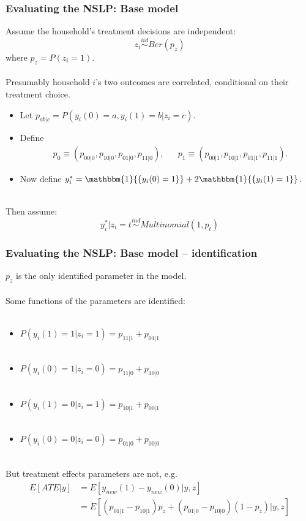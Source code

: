 \documentclass[xcolor=dvipsnames]{beamer}
\newcommand{\indicator}[1]{\mathbbm{1}{\left\{ {#1} \right\} }}
\begin{document}
\begin{frame}
  \frametitle{Evaluating the NSLP: Base model}
Assume the household's treatment decisions are independent:
    \[
    z_i \stackrel{iid}{\sim}Ber(p_z)
    \]
    where $p_z=P(z_i=1)$.\\~\\
\pause Presumably household $i$'s two outcomes are correlated, conditional on their treatment choice. 
    \begin{itemize}
      \item Let $  p_{ab|c} = P(y_i(0)=a, y_i(1)=b|z_i=c)$.
      \item Define 
        \begin{align*}
          &p_0\equiv (p_{00|0}, p_{10|0}, p_{01|0}, p_{11|0}), &&p_1\equiv (p_{00|1}, p_{10|1}, p_{01|1}, p_{11|1}).
        \end{align*}
      \item Now define $y_i^*=\indicator{y_i(0)=1} + 2\indicator{y_i(1)=1}$. \\~
      \end{itemize}
\pause Then assume:
    \[
    y_i^*|z_i=t \stackrel{ind}{\sim}Multinomial(1,p_t)
    \]
\end{frame}

\begin{frame}
  \frametitle{Evaluating the NSLP: Base model -- identification}
$p_z$ is the only identified parameter in the model.\\~\\
 Some functions of the parameters are identified: \\~\\
    \begin{itemize}
      \item $P(y_i(1)=1|z_i=1) = p_{11|1} + p_{01|1}$\\~\\  
      \item $P(y_i(0)=1|z_i=0) =p_{11|0} + p_{10|0}$\\~\\
      \item $P(y_i(1)=0|z_i=1) =p_{10|1} + p_{00|1}$\\~\\ 
      \item $P(y_i(0)=0|z_i=0) =p_{01|0} + p_{00|0}$\\~\\
      \end{itemize}
But treatment effects parameters are not, e.g.
\begin{align*}
E[ATE|y] &= E[y_{new}(1) - y_{new}(0)|y,z] \\
&=E[(p_{01|1} - p_{10|1})p_z + (p_{01|0} - p_{10|0})(1-p_z)|y,z] 
\end{align*}
\end{frame}
\end{document}

